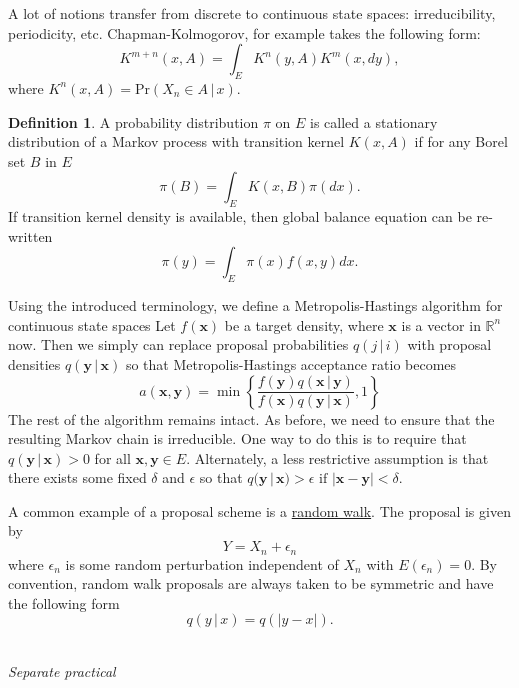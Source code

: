 \documentclass[11pt]{article}\usepackage[]{graphicx}\usepackage[]{color}
\numberwithin{algorithm}{section}
\newcommand{\cprob}[2]{\ensuremath{\text{Pr}\left(#1 \,|\,#2\right)}}
\theoremstyle{remark}
\theoremstyle{definition}
\newtheorem*{define}{Definition}
\newenvironment{example}[1]{\begin{trivlist}
\item[\hskip \labelsep {\bfseries Example}: \underline{#1}]\ \\}{\end{trivlist}}
\begin{document}
A lot of notions transfer from discrete to continuous state spaces: irreducibility, periodicity, etc. 
Chapman-Kolmogorov, for example takes the following form:
\[
K^{m+n}(x,A) = \int_E K^n(y,A)K^{m}(x,dy),
\]
where $K^n(x,A) = \cprob{X_n \in A}{x}$. 
\begin{define}
  A probability distribution $\pi$ on $E$ is called a stationary distribution of a Markov process with 
  transition kernel $K(x,A)$ if for any Borel set $B$ in $E$
  \[
  \pi(B) = \int_E K(x,B)\pi(dx).
  \]
  If transition kernel density is available, then global balance equation can be re-written
  \[
  \pi(y) = \int_E \pi(x) f(x,y) dx.
  \]
\end{define}
\par
Using the introduced terminology, we define a Metropolis-Hastings algorithm for continuous state spaces 
Let $f(\mathbf{x})$ be a target density, where $\mathbf{x}$
is a vector in $\mathbb{R}^n$ now. Then we simply can replace proposal probabilities 
$q(j\,|\,i)$ with proposal densities $q(\mathbf{y}\,|\,\mathbf{x})$ so that Metropolis-Hastings 
acceptance ratio becomes
\begin{equation}
  a(\mathbf{x},\mathbf{y}) = \min \left\{ \frac{f(\mathbf{y}) q(\mathbf{x}\,|\, \mathbf{y})}
    {f(\mathbf{x}) q(\mathbf{y}\,|\,\mathbf{x})},
    1 \right\} 
\end{equation}
The rest of the algorithm remains intact. As before, we need to ensure that the
resulting Markov chain is irreducible.  One way to do this is to require that 
$q(\mathbf{y}\,|\, \mathbf{x}) > 0$ for all $\mathbf{x}, \mathbf{y} \in E$.  Alternately,
a less restrictive assumption is that there exists some fixed $\delta$ and
$\epsilon$ so that $q(\mathbf{y}\,|\,\mathbf{x}) > \epsilon \text{ if } |\mathbf{x} - \mathbf{y}|< \delta$.
\par
A common example of a proposal scheme is a \underline{random walk}.
The proposal is given by
\begin{equation}
  Y = X_n + \epsilon_n
\end{equation}
where $\epsilon_n$ is some random perturbation independent of $X_n$ with $E(\epsilon_n) = 0$.
By convention, random walk proposals are always taken to be symmetric and have the following form
\begin{equation} 
  q(y \,|\, x) = q(|y - x|).
\end{equation}

\begin{example}{Approximating standard normal distribution} 
  \textit{Separate practical}
\end{example}
\end{document}
